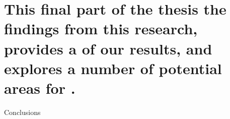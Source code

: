 
\part[Conclusions]{This final part of the thesis  the findings from this research, provides a  of our results, and explores a number of potential areas for .}{Conclusions}\label{part:conclusions}